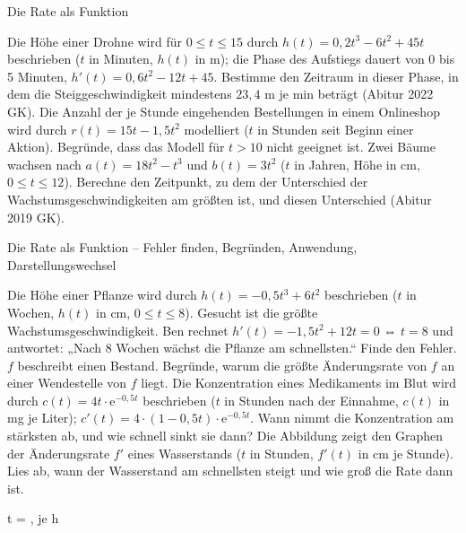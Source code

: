 \begin{aufgabe}{Die Rate als Funktion}
\begin{teile}
\teil Die Höhe einer Drohne wird für $0 \le t \le 15$ durch $h(t) = 0{,}2t^3 - 6t^2 + 45t$ beschrieben ($t$ in Minuten, $h(t)$ in m); die Phase des Aufstiegs dauert von 0 bis 5 Minuten, $h'(t) = 0{,}6t^2 - 12t + 45$. Bestimme den Zeitraum in dieser Phase, in dem die Steiggeschwindigkeit mindestens $23{,}4$ m je min beträgt \hfill (Abitur 2022 GK).
\teil Die Anzahl der je Stunde eingehenden Bestellungen in einem Onlineshop wird durch $r(t) = 15t - 1{,}5t^2$ modelliert ($t$ in Stunden seit Beginn einer Aktion). Begründe, dass das Modell für $t > 10$ nicht geeignet ist.
\teil Zwei Bäume wachsen nach $a(t) = 18t^2 - t^3$ und $b(t) = 3t^2$ ($t$ in Jahren, Höhe in cm, $0 \le t \le 12$). Berechne den Zeitpunkt, zu dem der Unterschied der Wachstumsgeschwindigkeiten am größten ist, und diesen Unterschied \hfill (Abitur 2019 GK).
\end{teile}
\end{aufgabe}

\begin{aufgabe}{Die Rate als Funktion – Fehler finden, Begründen, Anwendung, Darstellungswechsel}
\begin{teile}
\teil Die Höhe einer Pflanze wird durch $h(t) = -0{,}5t^3 + 6t^2$ beschrieben ($t$ in Wochen, $h(t)$ in cm, $0 \le t \le 8$). Gesucht ist die größte Wachstumsgeschwindigkeit. Ben rechnet $h'(t) = -1{,}5t^2 + 12t = 0$ ⇔ $t = 8$ und antwortet: „Nach 8 Wochen wächst die Pflanze am schnellsten.“ Finde den Fehler.
\teil $f$ beschreibt einen Bestand. Begründe, warum die größte Änderungsrate von $f$ an einer Wendestelle von $f$ liegt.
\teil Die Konzentration eines Medikaments im Blut wird durch $c(t) = 4t \cdot \mathrm{e}^{-0{,}5t}$ beschrieben ($t$ in Stunden nach der Einnahme, $c(t)$ in mg je Liter); $c'(t) = 4 \cdot (1 - 0{,}5t) \cdot \mathrm{e}^{-0{,}5t}$. Wann nimmt die Konzentration am stärksten ab, und wie schnell sinkt sie dann?
\teil Die Abbildung zeigt den Graphen der Änderungsrate $f'$ eines Wasserstands ($t$ in Stunden, $f'(t)$ in cm je Stunde). Lies ab, wann der Wasserstand am schnellsten steigt und wie groß die Rate dann ist.

\begin{ksys}[xmin=0,xmax=8,ymin=-2,ymax=10,xstep=1,ystep=2,xlabel=t in h,ylabel=f'(t),ablesen]\end{ksys}
t = \leerfeld , \leerfeld[cm] je h
\end{teile}
\end{aufgabe}
